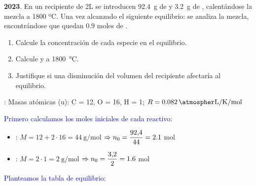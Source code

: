 \begin{exerciseEVAU}
    \textbf{2023}.
    En un recipiente de 2L se introducen \SI{92,4}{\g} de  y \SI{3,2}{\g} de , calentándose la mezcla a 1800 ºC. Una vez alcanzado el siguiente equilibrio:  se analiza la mezcla, encontrándose que quedan \num{0,9} moles de .

    \begin{enumerate}[label=\letraminuscula]
        \item Calcule la concentración de cada especie en el equilibrio.
        \item Calcule \Kc{} y \Kp{} a \SI{1800}{\celsius}.
        \item Justifique si una disminución del volumen del recipiente afectaría al equilibrio.
    \end{enumerate}

    \datos{}: Masas atómicas (u): C = 12, O = 16, H = 1; \(R = \ctegases\)

    \begin{solu}

    \textcolor{blue}{Primero calculamos los moles iniciales de cada reactivo:}
    \begin{itemize}
        \item {}: \(M = 12 + 2\cdot16 = \qty{44}{\g\per\mol}\) \(\Rightarrow n_0 = \dfrac{92{,}4}{44} = \num{2{,}1}\) mol
        \item {}: \(M = 2\cdot1 = \qty{2}{\g\per\mol}\) \(\Rightarrow n_0 = \dfrac{3{,}2}{2} = \num{1{,}6}\) mol
    \end{itemize}

    \textcolor{blue}{Planteamos la tabla de equilibrio:}


\end{solu}
\end{exerciseEVAU}
